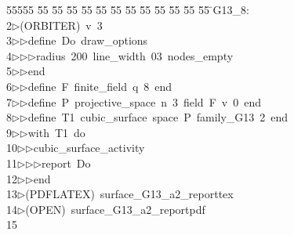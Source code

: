 %
%
\begin{tabbing}
55555 \= 55 \= 55 \= 55 \= 55 \= 55 \= 55 \= 55 \= 55 \= 55 \= 55 \= 55 \= 55 \= \>G13\_8:\\[0pt]
2\>$\triangleright$\>(ORBITER)\ v\ 3\ \\[0pt]
3\>$\triangleright$\>$\triangleright$\>define\ Do\ draw\_options\ \\[0pt]
4\>$\triangleright$\>$\triangleright$\>$\triangleright$\>radius\ 200\ line\_width\ 03\ nodes\_empty\ \\[0pt]
5\>$\triangleright$\>$\triangleright$\>end\ \\[0pt]
6\>$\triangleright$\>$\triangleright$\>define\ F\ finite\_field\ q\ 8\ end\ \\[0pt]
7\>$\triangleright$\>$\triangleright$\>define\ P\ projective\_space\ n\ 3\ field\ F\ v\ 0\ end\ \\[0pt]
8\>$\triangleright$\>$\triangleright$\>define\ T1\ cubic\_surface\ space\ P\ family\_G13\ 2\ end\ \\[0pt]
9\>$\triangleright$\>$\triangleright$\>with\ T1\ do\ \\[0pt]
10\>$\triangleright$\>$\triangleright$\>cubic\_surface\_activity\ \\[0pt]
11\>$\triangleright$\>$\triangleright$\>$\triangleright$\>report\ Do\ \\[0pt]
12\>$\triangleright$\>$\triangleright$\>end\\[0pt]
13\>$\triangleright$\>(PDFLATEX)\ surface\_G13\_a2\_reporttex\\[0pt]
14\>$\triangleright$\>(OPEN)\ surface\_G13\_a2\_reportpdf\\[0pt]
15\>\end{tabbing}
